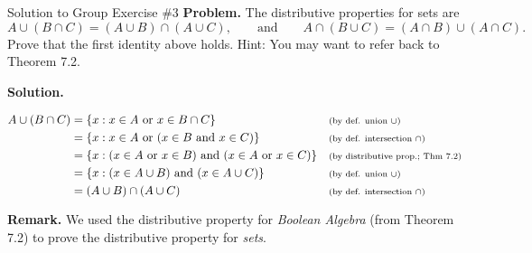 \documentclass[10pt]{beamer}
\begin{document}
\begin{frame}{Solution to Group Exercise \#3 }
\footnotesize 
\textbf{Problem.} The distributive properties for sets are 
    \[ A \cup (B \cap C) = (A \cup B) \cap (A \cup C), \qquad \text{and} \qquad  A \cap (B \cup C) = (A \cap B) \cup (A \cap C). \]
Prove that the first identity above holds.  Hint: You may want to refer back to Theorem 7.2.	

\textbf{Solution.}

\begin{align*}
A \cup (B \cap C) &= \{ {x: x \in A \text{ or } x \in B \cap C} \} && \text{\scriptsize{{(by def. union $\cup$)}}} \\
&= \{ {x: x \in A \text{ or } (x \in B \text{ and }  x \in C) } \} && \text{\scriptsize{{(by def. intersection $\cap$)}}} \\
&= \{ {x: (x \in A \text{ or } x \in B) \text{ and }  (x \in A \text{ or } x \in C) } \} && \text{\scriptsize{{(by distributive prop.; Thm 7.2)}}} \\
&= \{ {x: (x \in A \cup B) \text{ and }  (x \in A \cup C)} \} && \text{\scriptsize{{(by def. union $\cup$)}}} \\
&= (A \cup B) \cap (A \cup C) && \text{\scriptsize{{(by def. intersection $\cap$)}}}
\end{align*}

\textbf{Remark.} We used the distributive property for \textit{Boolean Algebra} (from Theorem 7.2) to prove the distributive property for \textit{sets}.
\end{frame}
\end{document}
